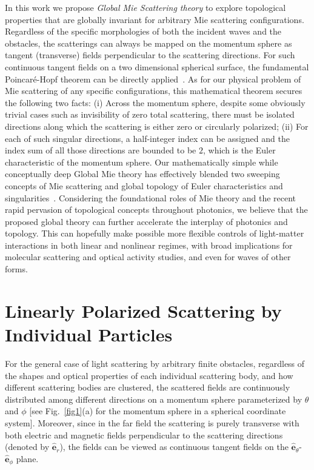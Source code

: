 \documentclass[aps,twocolumn,superscriptaddress]{revtex4-1}
\newcounter{Fig}
\begin{document}
In this work we propose \textit{Global Mie Scattering theory} to explore topological properties that are globally invariant for arbitrary Mie scattering configurations. Regardless of the specific morphologies of both the incident waves and the obstacles, the scatterings can always be mapped on the momentum sphere as tangent (transverse) fields perpendicular to the scattering directions. For such continuous tangent fields on a two dimensional spherical surface, the fundamental Poincar\'{e}-Hopf theorem can be directly applied~\cite{MILNOR_1997__Topology,NEEDHAM_1998__Visual}. As for our physical problem of Mie scattering of any specific configurations, this mathematical theorem secures the following two facts: (i) Across the momentum sphere, despite some obviously trivial cases such as invisibility of zero total scattering, there must be isolated directions along which the scattering is either zero or circularly polarized; (ii) For each of such singular directions, a half-integer index can be assigned and the index sum of all those directions are bounded to be $2$, which is the Euler characteristic of the momentum sphere.  Our mathematically simple while conceptually deep Global Mie theory has effectively blended two sweeping concepts of Mie scattering and  global topology of Euler characteristics and singularities~\cite{MILNOR_1997__Topology,NEEDHAM_1998__Visual}. Considering the foundational roles of Mie theory and the recent rapid pervasion of topological concepts throughout photonics,  we believe that the proposed global theory can further accelerate the interplay of photonics and topology. This can hopefully make possible more flexible controls of light-matter interactions in both linear and nonlinear regimes, with broad implications for molecular scattering and optical activity studies, and even for waves of other forms.

\section{Linearly Polarized Scattering by Individual Particles}
For the general case of light scattering by arbitrary finite obstacles, regardless of the shapes and optical properties of each individual scattering body, and how different scattering bodies are clustered, the scattered fields are continuously distributed among different directions on a momentum sphere parameterized by $\theta$ and $\phi$ [see Fig.~\ref{fig1}(a) for the momentum sphere in a spherical coordinate system].  Moreover, since in the far field the scattering is purely transverse with both electric and magnetic fields perpendicular to the scattering directions (denoted by $\mathbf{\hat{e}}_r$), the fields can be viewed as continuous tangent fields on the $\mathbf{\hat{e}}_\theta$-$\mathbf{\hat{e}}_\phi$  plane.
\end{document}
